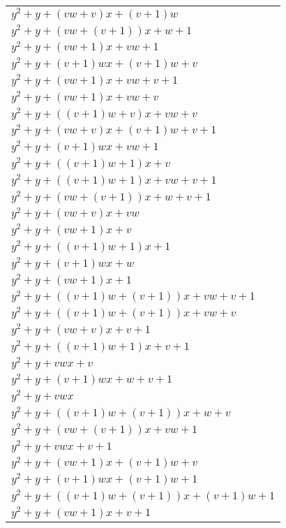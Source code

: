 \begin{center}
\begin{longtable}{|l|}
	$y^2 + y + (vw + v)x + (v + 1)w$ \\
	$y^2 + y + (vw + (v + 1))x + w + 1$ \\
	$y^2 + y + (vw + 1)x + vw + 1$ \\
	$y^2 + y + (v + 1)wx + (v + 1)w + v$ \\
	$y^2 + y + (vw + 1)x + vw + v + 1$ \\
	$y^2 + y + (vw + 1)x + vw + v$ \\
	$y^2 + y + ((v + 1)w + v)x + vw + v$ \\
	$y^2 + y + (vw + v)x + (v + 1)w + v + 1$ \\
	$y^2 + y + (v + 1)wx + vw + 1$ \\
	$y^2 + y + ((v + 1)w + 1)x + v$ \\
	$y^2 + y + ((v + 1)w + 1)x + vw + v + 1$ \\
	$y^2 + y + (vw + (v + 1))x + w + v + 1$ \\
	$y^2 + y + (vw + v)x + vw$ \\
	$y^2 + y + (vw + 1)x + v$ \\
	$y^2 + y + ((v + 1)w + 1)x + 1$ \\
	$y^2 + y + (v + 1)wx + w$ \\
	$y^2 + y + (vw + 1)x + 1$ \\
	$y^2 + y + ((v + 1)w + (v + 1))x + vw + v + 1$ \\
	$y^2 + y + ((v + 1)w + (v + 1))x + vw + v$ \\
	$y^2 + y + (vw + v)x + v + 1$ \\
	$y^2 + y + ((v + 1)w + 1)x + v + 1$ \\
	$y^2 + y + vwx + v$ \\
	$y^2 + y + (v + 1)wx + w + v + 1$ \\
	$y^2 + y + vwx$ \\
	$y^2 + y + ((v + 1)w + (v + 1))x + w + v$ \\
	$y^2 + y + (vw + (v + 1))x + vw + 1$ \\
	$y^2 + y + vwx + v + 1$ \\
	$y^2 + y + (vw + 1)x + (v + 1)w + v$ \\
	$y^2 + y + (v + 1)wx + (v + 1)w + 1$ \\
	$y^2 + y + ((v + 1)w + (v + 1))x + (v + 1)w + 1$ \\
	$y^2 + y + (vw + 1)x + v + 1$ \\
\hline
\end{longtable}
\end{center}

